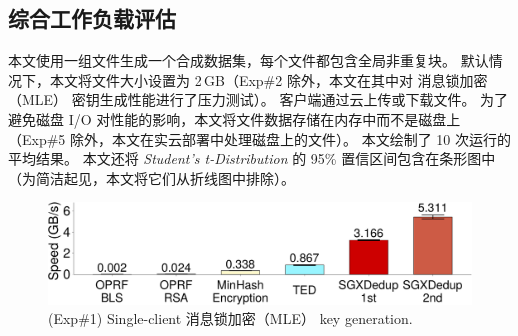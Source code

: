 \subsection{综合工作负载评估}
\label{subsec:sgxdedup-synthetic}


本文使用一组文件生成一个合成数据集，每个文件都包含全局非重复块。 默认情况下，本文将文件大小设置为 2\,GB（Exp\#2 除外，本文在其中对 消息锁加密（MLE） 密钥生成性能进行了压力测试）。 客户端通过云上传或下载文件。 为了避免磁盘 I/O 对性能的影响，本文将文件数据存储在内存中而不是磁盘上（Exp\#5 除外，本文在实云部署中处理磁盘上的文件）。 本文绘制了 10 次运行的平均结果。 本文还将 \textit{ Student's t-Distribution} 的 95\% 置信区间包含在条形图中（为简洁起见，本文将它们从折线图中排除）。


\begin{figure}[!htb]
\centering
\includegraphics[width=\textwidth]{pic/sgxdedup/expa2_keyGenPerformance.pdf}
\vspace{-12pt}
\caption{(Exp\#1) Single-client 消息锁加密（MLE） key generation.}
\label{fig:sgxdedup-keygen-comparison}
\end{figure}

